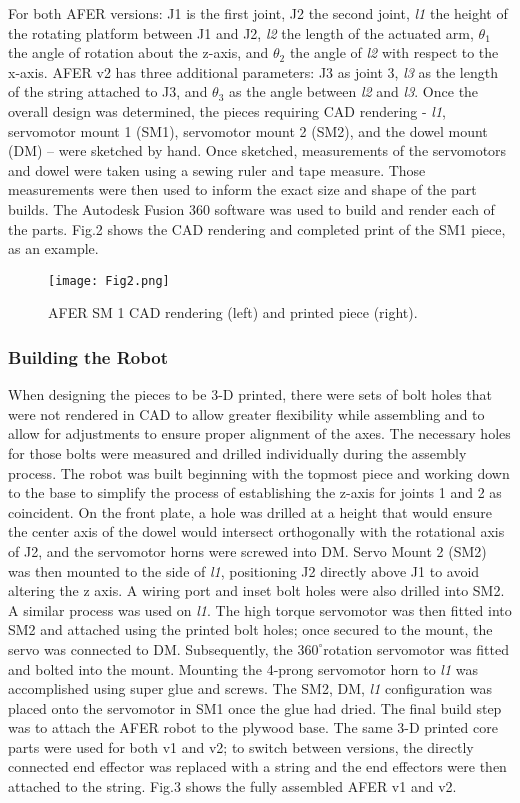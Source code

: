 For both AFER versions: J1 is the first joint, J2 the second joint,  \textit{l1} the height of the rotating platform between J1 and J2,  \textit{l2} the length of the actuated arm, $\theta_{1}$ the angle of rotation about the z-axis, and $\theta_{2}$ the angle of \textit{l2} with respect to the x-axis. AFER v2 has three additional parameters: J3 as joint 3, \textit{l3} as the length of the string attached to J3, and $\theta_{3}$ as the angle between \textit{l2} and \textit{l3}.
Once the overall design was determined, the pieces requiring CAD rendering - \textit{l1}, servomotor mount 1 (SM1), servomotor mount 2 (SM2), and the dowel mount (DM) – were sketched by hand. Once sketched, measurements of the servomotors and dowel were taken using a sewing ruler and tape measure. Those measurements were then used to inform the exact size and shape of the part builds. The Autodesk Fusion 360 software was used to build and render each of the parts. Fig.2 shows the CAD rendering and completed print of the SM1 piece, as an example.

\begin{figure}[h!]
\texttt{[image: Fig2.png]}
\caption{AFER SM 1 CAD rendering (left) and printed piece (right).}
\label{2}
\end{figure}

\subsubsection{Building the Robot}
When designing the pieces to be 3-D printed, there were sets of bolt holes that were not rendered in CAD to allow greater flexibility while assembling and to allow for adjustments to ensure proper alignment of the axes. The necessary holes for those bolts were measured and drilled individually during the assembly process. The robot was built beginning with the topmost piece and working down to the base to simplify the process of establishing the z-axis for joints 1 and 2 as coincident. 
On the front plate, a hole was drilled at a height that would ensure the center axis of the dowel would intersect orthogonally with the rotational axis of J2, and the servomotor horns were screwed into DM. Servo Mount 2 (SM2) was then mounted to the side of \textit{l1}, positioning J2 directly above J1 to avoid altering the z axis. A wiring port and inset bolt holes were also drilled into SM2. A similar process was used on \textit{l1}.
The high torque servomotor was then fitted into SM2 and attached using the printed bolt holes; once secured to the mount, the servo was connected to DM. Subsequently, the $360^{\circ}$rotation servomotor was fitted and bolted into the mount. Mounting the 4-prong servomotor horn to \textit{l1} was accomplished using super glue and screws. The SM2, DM, \textit{l1} configuration was placed onto the servomotor in SM1 once the glue had dried. 
The final build step was to attach the AFER robot to the plywood base. The same 3-D printed core parts were used for both v1 and v2; to switch between versions, the directly connected end effector was replaced with a string and the end effectors were then attached to the string. Fig.3 shows the fully assembled AFER v1 and v2.

